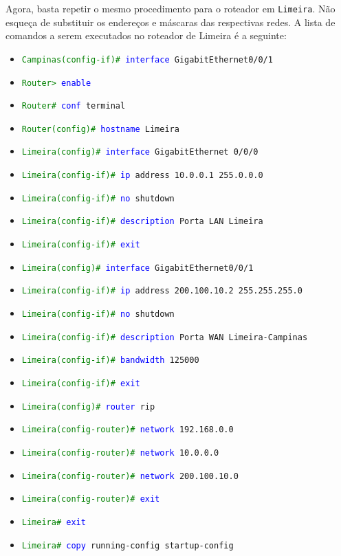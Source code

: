Agora, basta repetir o mesmo procedimento para o roteador em \texttt{Limeira}. Não esqueça de substituir os endereços e máscaras das respectivas redes. A lista de comandos a serem executados no roteador de Limeira é a seguinte:
\begin{itemize}
    \item \texttt{\textcolor{green}{Campinas(config-if)\#} \textcolor{blue}{interface} GigabitEthernet0/0/1}
    \item \texttt{\textcolor{green}{Router>} \textcolor{blue}{enable}}
\item \texttt{\textcolor{green}{Router\#} \textcolor{blue}{conf} terminal}
\item \texttt{\textcolor{green}{Router(config)\#} \textcolor{blue}{hostname} Limeira}
\item \texttt{\textcolor{green}{Limeira(config)\#} \textcolor{blue}{interface} GigabitEthernet 0/0/0}
\item \texttt{\textcolor{green}{Limeira(config-if)\#} \textcolor{blue}{ip} address 10.0.0.1 255.0.0.0}
\item \texttt{\textcolor{green}{Limeira(config-if)\#} \textcolor{blue}{no} shutdown}
\item \texttt{\textcolor{green}{Limeira(config-if)\#} \textcolor{blue}{description} Porta LAN Limeira}
\item \texttt{\textcolor{green}{Limeira(config-if)\#} \textcolor{blue}{exit}}
\item \texttt{\textcolor{green}{Limeira(config)\#} \textcolor{blue}{interface} GigabitEthernet0/0/1}
\item \texttt{\textcolor{green}{Limeira(config-if)\#} \textcolor{blue}{ip} address 200.100.10.2 255.255.255.0}
\item \texttt{\textcolor{green}{Limeira(config-if)\#} \textcolor{blue}{no} shutdown}
\item \texttt{\textcolor{green}{Limeira(config-if)\#} \textcolor{blue}{description} Porta WAN Limeira-Campinas}
\item \texttt{\textcolor{green}{Limeira(config-if)\#} \textcolor{blue}{bandwidth} 125000}
\item \texttt{\textcolor{green}{Limeira(config-if)\#} \textcolor{blue}{exit}}
\item \texttt{\textcolor{green}{Limeira(config)\#} \textcolor{blue}{router} rip}
\item \texttt{\textcolor{green}{Limeira(config-router)\#} \textcolor{blue}{network} 192.168.0.0}
\item \texttt{\textcolor{green}{Limeira(config-router)\#} \textcolor{blue}{network} 10.0.0.0}
\item \texttt{\textcolor{green}{Limeira(config-router)\#} \textcolor{blue}{network} 200.100.10.0}
\item \texttt{\textcolor{green}{Limeira(config-router)\#} \textcolor{blue}{exit}}
\item \texttt{\textcolor{green}{Limeira\#} \textcolor{blue}{exit}}
\item \texttt{\textcolor{green}{Limeira\#} \textcolor{blue}{copy} running-config startup-config}
\end{itemize}

